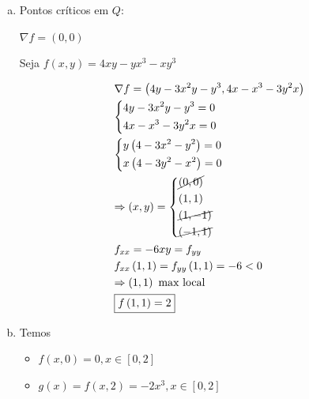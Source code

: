 \documentclass[11pt, oneside, a4paper]{gsm-l}
\begin{document}
\begin{enumerate}
\begin{sol}
  \begin{enumerate}[(a)]
    \item Pontos críticos em $Q$:

    $\nabla f = (0,0)$

    Seja $f\left( {x,y} \right) = 4xy - yx^3  - xy^3$

\[
\begin{gathered}
  \nabla f = \left( {4y - 3x^2 y - y^3 ,4x - x^3  - 3y^2 x} \right) \hfill \\
  \left\{ \begin{gathered}
  4y - 3x^2 y - y^3  = 0 \hfill \\
  4x - x^3  - 3y^2 x = 0 \hfill \\
\end{gathered}  \right. \hfill \\
  \left\{ \begin{gathered}
  y\left( {4 - 3x^2  - y^2 } \right) = 0 \hfill \\
  x\left( {4 - 3y^2  - x^2 } \right) = 0 \hfill \\
\end{gathered}  \right. \hfill \\
   \Rightarrow \left( {x,y} \right) = \left\{ \begin{gathered}
  \cancel{ \left( {0,0} \right) } \hfill \\
  \left( {1,1} \right) \hfill \\
  \cancel{ \left( {1, - 1} \right) } \hfill \\
  \cancel{ \left( { - 1,1} \right) } \hfill \\
\end{gathered}  \right. \hfill \\
  f_{xx}  =  - 6xy = f_{yy}  \hfill \\
  f_{xx} \left( {1,1} \right) = f_{yy} \left( {1,1} \right) =  - 6 < 0 \hfill \\
   \Rightarrow \left( {1,1} \right){\text{ max local}} \hfill \\
  \boxed{f\left( {1,1} \right) = 2} \hfill \\
\end{gathered}
\]


    \item Temos

    \begin{itemize}
      \item $f(x,0)=0,x \in \left[ {0,2} \right]$
      \item $g(x)=f(x,2)=-2x^3,x \in \left[ {0,2} \right]$


\end{itemize}
\end{enumerate}
\end{sol}
\end{enumerate}
\end{document}

